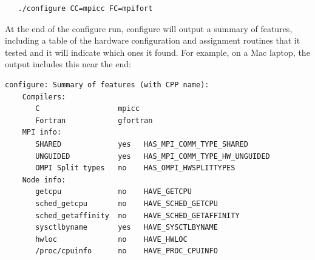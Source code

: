 \documentclass[11pt,letterpaper]{report}
\begin{document}
\begin{verbatim}
   ./configure CC=mpicc FC=mpifort
\end{verbatim}

At the end of the configure run, configure will output a summary of
features, including a table of the hardware configuration and
assignment routines that it tested and it will indicate which ones it
found.
For example, on a Mac laptop, the output includes this near the end:
\begin{verbatim}
configure: Summary of features (with CPP name):
    Compilers:
       C                  mpicc
       Fortran            gfortran
    MPI info:
       SHARED             yes   HAS_MPI_COMM_TYPE_SHARED
       UNGUIDED           yes   HAS_MPI_COMM_TYPE_HW_UNGUIDED
       OMPI Split types   no    HAS_OMPI_HWSPLITTYPES
    Node info:
       getcpu             no    HAVE_GETCPU
       sched_getcpu       no    HAVE_SCHED_GETCPU
       sched_getaffinity  no    HAVE_SCHED_GETAFFINITY
       sysctlbyname       yes   HAVE_SYSCTLBYNAME
       hwloc              no    HAVE_HWLOC
       /proc/cpuinfo      no    HAVE_PROC_CPUINFO

\end{verbatim}


\appendix
\end{document}
